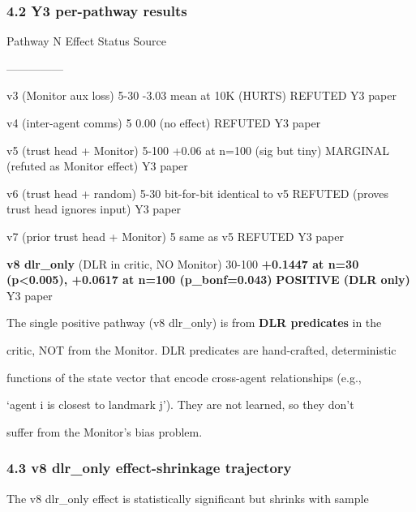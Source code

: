 \documentclass[
]{article}
\begin{document}
\subsubsection{4.2 Y3 per-pathway results}\label{y3-per-pathway-results}

Pathway \textbar{} N \textbar{} Effect \textbar{} Status \textbar{}
Source \textbar{}

\textbar---\textbar---\textbar---\textbar---\textbar---\textbar{}

v3 (Monitor aux loss) \textbar{} 5-30 \textbar{} -3.03 mean at 10K
(HURTS) \textbar{} REFUTED \textbar{} Y3 paper \textbar{}

v4 (inter-agent comms) \textbar{} 5 \textbar{} 0.00 (no effect)
\textbar{} REFUTED \textbar{} Y3 paper \textbar{}

v5 (trust head + Monitor) \textbar{} 5-100 \textbar{} +0.06 at n=100
(sig but tiny) \textbar{} MARGINAL (refuted as Monitor effect)
\textbar{} Y3 paper \textbar{}

v6 (trust head + random) \textbar{} 5-30 \textbar{} bit-for-bit
identical to v5 \textbar{} REFUTED (proves trust head ignores input)
\textbar{} Y3 paper \textbar{}

v7 (prior trust head + Monitor) \textbar{} 5 \textbar{} same as v5
\textbar{} REFUTED \textbar{} Y3 paper \textbar{}

\textbf{v8 dlr\_only} (DLR in critic, NO Monitor) \textbar{} 30-100
\textbar{} \textbf{+0.1447 at n=30 (p\textless0.005), +0.0617 at n=100
(p\_bonf=0.043)} \textbar{} \textbf{POSITIVE (DLR only)} \textbar{} Y3
paper \textbar{}

The single positive pathway (v8 dlr\_only) is from \textbf{DLR
predicates} in the

critic, NOT from the Monitor. DLR predicates are hand-crafted,
deterministic

functions of the state vector that encode cross-agent relationships
(e.g.,

`agent i is closest to landmark j'). They are not learned, so they don't

suffer from the Monitor's bias problem.

\subsubsection{4.3 v8 dlr\_only effect-shrinkage
trajectory}\label{v8-dlr_only-effect-shrinkage-trajectory}

The v8 dlr\_only effect is statistically significant but shrinks with
sample
\end{document}
